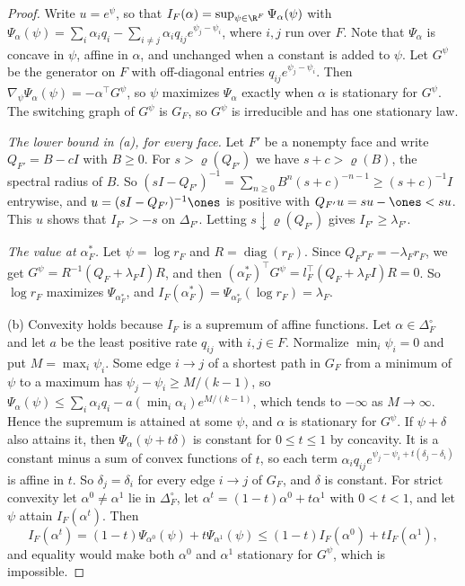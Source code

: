 \begin{proof}
Write $u=e^\psi$, so that $I_F(\alpha)=\sup_{\psi\in\R^F}\Psi_\alpha(\psi)$
with
$\Psi_\alpha(\psi)=\sum_i\alpha_iq_i-\sum_{i\ne j}\alpha_iq_{ij}e^{\psi_j-\psi_i}$,
where $i,j$ run over $F$. Note that $\Psi_\alpha$ is concave in $\psi$, affine in
$\alpha$, and unchanged when a constant is added to $\psi$. Let $G^\psi$ be the
generator on $F$ with off-diagonal entries $q_{ij}e^{\psi_j-\psi_i}$. Then
$\nabla_\psi\Psi_\alpha(\psi)=-\alpha^\top G^\psi$, so $\psi$ maximizes
$\Psi_\alpha$ exactly when $\alpha$ is stationary for $G^\psi$. The switching
graph of $G^\psi$ is $G_F$, so $G^\psi$ is irreducible and has one stationary
law.

\emph{The lower bound in (a), for every face.} Let $F'$ be a nonempty face and
write $Q_{F'}=B-cI$ with $B\ge0$. For $s>\varrho(Q_{F'})$ we have
$s+c>\varrho(B)$, the spectral radius of $B$. So
$(sI-Q_{F'})^{-1}=\sum_{n\ge0}B^n(s+c)^{-n-1}\ge(s+c)^{-1}I$ entrywise, and
$u=(sI-Q_{F'})^{-1}\ones$ is positive with $Q_{F'}u=su-\ones<su$. This $u$
shows that $I_{F'}>-s$ on $\Delta_{F'}$. Letting $s\downarrow\varrho(Q_{F'})$
gives $I_{F'}\ge\lambda_{F'}$.

\emph{The value at $\alpha^*_F$.} Let $\psi=\log r_F$ and
$R=\operatorname{diag}(r_F)$. Since $Q_Fr_F=-\lambda_Fr_F$, we get
$G^\psi=R^{-1}(Q_F+\lambda_FI)R$, and then
$(\alpha^*_F)^\top G^\psi=l_F^\top(Q_F+\lambda_FI)R=0$. So $\log r_F$
maximizes $\Psi_{\alpha^*_F}$, and $I_F(\alpha^*_F)=\Psi_{\alpha^*_F}(\log
r_F)=\lambda_F$.

(b) Convexity holds because $I_F$ is a supremum of affine functions. Let
$\alpha\in\Delta_F^\circ$ and let $a$ be the least positive rate $q_{ij}$ with
$i,j\in F$. Normalize $\min_i\psi_i=0$ and put $M=\max_i\psi_i$. Some edge
$i\to j$ of a shortest path in $G_F$ from a minimum of $\psi$ to a maximum has
$\psi_j-\psi_i\ge M/(k-1)$, so
$\Psi_\alpha(\psi)\le\sum_i\alpha_iq_i-a(\min_i\alpha_i)e^{M/(k-1)}$, which
tends to $-\infty$ as $M\to\infty$. Hence the supremum is attained at some
$\psi$, and $\alpha$ is stationary for $G^\psi$.
If $\psi+\delta$ also attains it, then $\Psi_\alpha(\psi+t\delta)$ is constant
for $0\le t\le1$ by concavity. It is a constant minus a sum of convex functions
of $t$, so each term $\alpha_iq_{ij}e^{\psi_j-\psi_i+t(\delta_j-\delta_i)}$ is
affine in $t$. So $\delta_j=\delta_i$ for every edge $i\to j$ of $G_F$, and
$\delta$ is constant. For strict convexity let $\alpha^0\ne\alpha^1$ lie in
$\Delta_F^\circ$, let $\alpha^t=(1-t)\alpha^0+t\alpha^1$ with $0<t<1$, and let
$\psi$ attain $I_F(\alpha^t)$. Then
\[
 I_F(\alpha^t)=(1-t)\Psi_{\alpha^0}(\psi)+t\Psi_{\alpha^1}(\psi)\le(1-t)I_F(\alpha^0)+tI_F(\alpha^1),
\]
and equality would make both $\alpha^0$ and $\alpha^1$ stationary for $G^\psi$,
which is impossible.


\end{proof}

